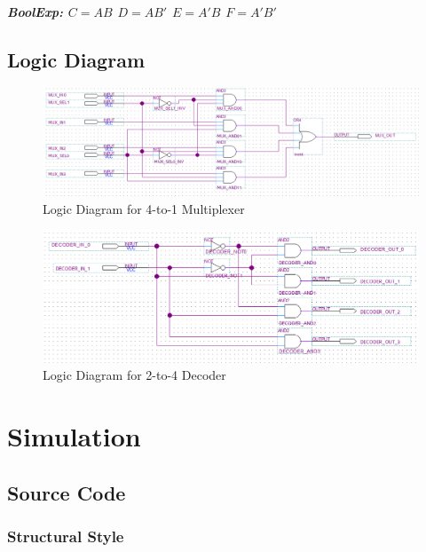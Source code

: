 \documentclass{report}
\begin{document}
                \paragraph{BoolExp: $ C = AB $ $ D = AB' $ $ E = A'B $ $ F = A'B' $}
        \newpage
        \section{Logic Diagram}
            \begin{figure}[ht]
                \centering
                \includegraphics[width=\textwidth]{diagrams/logic_mux.png}
                \caption{Logic Diagram for 4-to-1 Multiplexer}
            \end{figure}
            \begin{figure}[ht]
                \centering
                \includegraphics[width=\textwidth]{diagrams/logic_decoder.png}
                \caption{Logic Diagram for 2-to-4 Decoder}
            \end{figure}
    \chapter{Simulation}

        \section{Source Code}
            \subsection{Structural Style}
\end{document}
